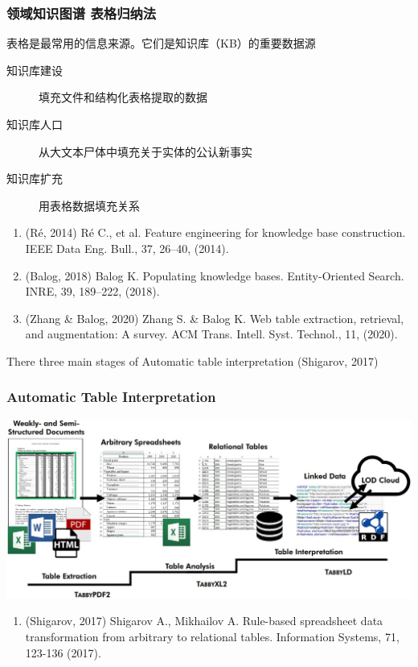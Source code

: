\documentclass[10pt]{beamer}
\begin{document}
\begin{frame}
  \frametitle{领域知识图谱 表格归纳法}
  表格是最常用的信息来源。它们是知识库（KB）的重要数据源
  \begin{description}
  \item[知识库建设] 填充文件和结构化表格提取的数据
  \item[知识库人口] 从大文本尸体中填充关于实体的公认新事实
  \item[知识库扩充] 用表格数据填充关系
  \end{description}
\vspace{1em}
{\footnotesize
\begin{enumerate}
\item (Ré, 2014) Ré C., et al. Feature engineering for knowledge base construction. IEEE Data Eng. Bull., 37, 26–40, (2014).
\item    (Balog, 2018) Balog K. Populating knowledge bases. Entity-Oriented Search. INRE, 39, 189–222, (2018).
\item    (Zhang \& Balog, 2020) Zhang S. \& Balog K. Web table extraction, retrieval, and augmentation: A survey. ACM Trans. Intell. Syst. Technol., 11, (2020).
  \end{enumerate}
}
\end{frame}

\begin{frame}
  There three main stages of Automatic table interpretation (Shigarov, 2017)
  \frametitle{Automatic Table Interpretation}

  \includegraphics[width=\linewidth]{table-descr-proc.jpg}

{\footnotesize
\begin{enumerate}
\item (Shigarov, 2017) Shigarov A., Mikhailov A. Rule-based spreadsheet data transformation from arbitrary to relational tables. Information Systems, 71, 123-136 (2017).
\end{enumerate}
}
\end{frame}
\end{document}
